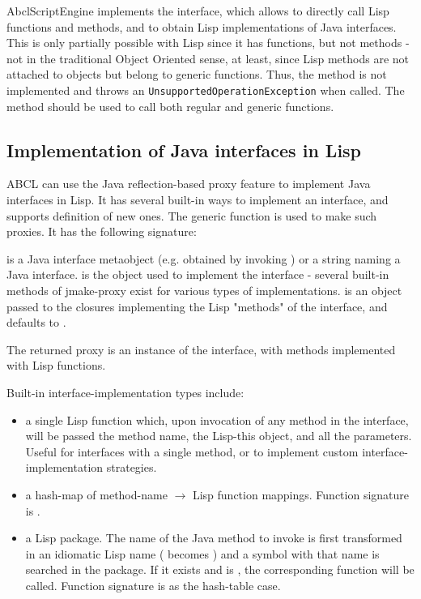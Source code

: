 \documentclass[10pt]{book}
\begin{document}
AbclScriptEngine implements the 
interface, which allows to directly call Lisp functions and methods,
and to obtain Lisp implementations of Java interfaces. This is only
partially possible with Lisp since it has functions, but not methods -
not in the traditional Object Oriented sense, at least, since Lisp methods are not
attached to objects but belong to generic functions. Thus, the method
 is not implemented and throws an
\texttt{UnsupportedOperationException} when called. The 
method should be used to call both regular and generic functions.

\subsection{Implementation of Java interfaces in Lisp}

ABCL can use the Java reflection-based proxy feature to implement Java
interfaces in Lisp. It has several built-in ways to implement an
interface, and supports definition of new ones. The
 generic function is used to make such
proxies. It has the following signature:


 is a Java interface metaobject (e.g. obtained by
invoking ) or a string naming a Java
interface.  is the object used to implement the
interface - several built-in methods of jmake-proxy exist for various
types of implementations.  is an object passed to the
closures implementing the Lisp "methods" of the interface, and
defaults to .

The returned proxy is an instance of the interface, with methods
implemented with Lisp functions.

Built-in interface-implementation types include:

\begin{itemize}
\item a single Lisp function which, upon invocation of any method in
  the interface, will be passed the method name, the Lisp-this object,
  and all the parameters. Useful for interfaces with a single method,
  or to implement custom interface-implementation strategies.
\item a hash-map of method-name $\rightarrow$ Lisp function mappings. Function
  signature is .
\item a Lisp package. The name of the Java method to invoke is first
  transformed in an idiomatic Lisp name ( becomes
  ) and a symbol with that name is searched in
  the package. If it exists and is , the corresponding function
  will be called. Function signature is as the hash-table case.
\end{itemize}
\end{document}
